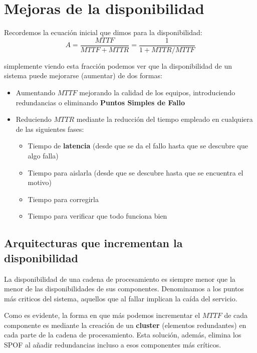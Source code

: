 \section{Mejoras de la disponibilidad}

Recordemos la ecuación inicial que dimos para la disponibilidad:
\[A=\frac{MTTF}{MTTF+MTTR}=\frac{1}{1+MTTR/MTTF}\]

simplemente viendo esta fracción podemos ver que la disponibilidad de un sistema puede mejorarse (aumentar) de dos formas:
\begin{itemize}
\item Aumentando $MTTF$ mejorando la calidad de los equipos, introduciendo redundancias o eliminando \textbf{Puntos Simples de Fallo}

\item Reduciendo $MTTR$ mediante la reducción del tiempo empleado en cualquiera de las siguientes fases:
\begin{itemize}
\item Tiempo de \textbf{latencia} (desde que se da el fallo hasta que se descubre que algo falla)

\item Tiempo para aislarla (desde que se descubre hasta que se encuentra el motivo)

\item Tiempo para corregirla

\item Tiempo para verificar que todo funciona bien
\end{itemize}
\end{itemize}

\subsection{Arquitecturas que incrementan la disponibilidad}

La disponibilidad de una cadena de procesamiento es siempre menor que la menor de las disponibilidades de sus componentes. Denominamos  a los puntos más criticos del sistema, aquellos que al fallar implican la caída del servicio.

Como es evidente, la forma en que más podemos incrementar el $MTTF$ de cada componente es mediante la creación de un \textbf{cluster} (elementos redundantes) en cada parte de la cadena de procesamiento. Esta solución, además, elimina los SPOF al añadir redundancias incluso a esos componentes más críticos.

